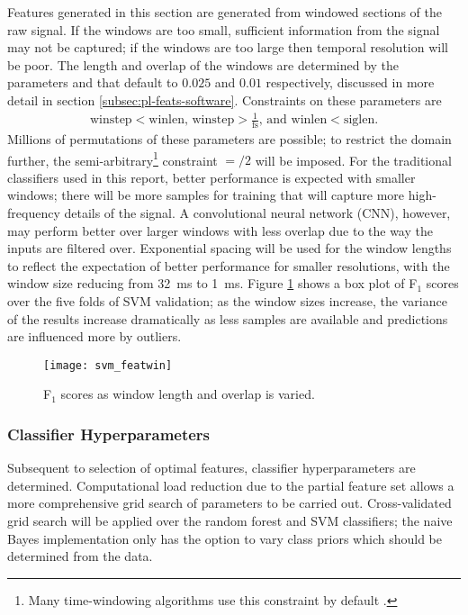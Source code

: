             Features generated in this section are generated from windowed sections of the raw signal. If the windows are too small, sufficient information from the signal may not be captured; if the windows are too large then temporal resolution will be poor. The length and overlap of the windows are determined by the parameters  and  that default to $0.025$ and $0.01$ respectively, discussed in more detail in section \ref{subsec:pl-feats-software}. Constraints on these parameters are 
            \begin{align}
                \text{winstep} < \text{winlen, winstep} > \frac{1}{\text{fs}} \text{, and winlen} < \text{siglen}.
            \end{align}
            Millions of permutations of these parameters are possible; to restrict the domain further, the semi-arbitrary\footnote{Many time-windowing algorithms use this constraint by default \cite{MathWorks,Octave}.} constraint $=$$/2$ will be imposed. For the traditional classifiers used in this report, better performance is expected with smaller windows; there will be more samples for training that will capture more high-frequency details of the signal. A convolutional neural network (CNN), however, may perform better over larger windows with less overlap \cite{Han} due to the way the inputs are filtered over. Exponential spacing will be used for the window lengths to reflect the expectation of better performance for smaller resolutions, with the window size reducing from \SI{32}{\milli\second} to \SI{1}{\milli\second}. Figure \ref{fig:exp-clf-opt-svmfeatwin} shows a box plot of F$_{1}$ scores over the five folds of SVM validation; as the window sizes increase, the variance of the results increase dramatically as less samples are available and predictions are influenced more by outliers. 
            
            \begin{figure}[ht]
                \centering
                \texttt{[image: svm\_featwin]}
                \caption{F$_{1}$ scores as window length and overlap is varied.}
                \label{fig:exp-clf-opt-svmfeatwin}
            \end{figure}
  
        
        \subsubsection{Classifier Hyperparameters}
        \label{subsubsec:exp-clf-opt-param}
            Subsequent to selection of optimal features, classifier hyperparameters are determined. Computational load reduction due to the partial feature set allows a more comprehensive grid search of parameters to be carried out. Cross-validated grid search will be applied over the random forest and SVM classifiers; the naive Bayes implementation only has the option to vary class priors which should be determined from the data.
            

